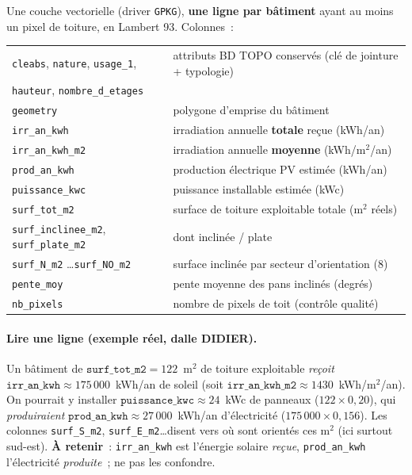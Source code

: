 \documentclass[11pt,a4paper]{article}
\newcommand{\fichier}[1]{\texttt{#1}}
\newcommand{\fonction}[1]{\texttt{#1}}
\begin{document}
Une couche vectorielle (driver \fichier{GPKG}), \textbf{une ligne par bâtiment}
ayant au moins un pixel de toiture, en Lambert 93. Colonnes~:

\begin{center}
\begin{tabular}{@{}l p{9cm}@{}}
\toprule
\fichier{cleabs}, \fichier{nature}, \fichier{usage\_1}, & attributs BD TOPO
conservés (clé de jointure + typologie)\\
\fichier{hauteur}, \fichier{nombre\_d\_etages} & \\
\fichier{geometry} & polygone d'emprise du bâtiment\\
\midrule
\fichier{irr\_an\_kwh} & irradiation annuelle \textbf{totale} reçue (kWh/an)\\
\fichier{irr\_an\_kwh\_m2} & irradiation annuelle \textbf{moyenne} (kWh/m$^2$/an)\\
\fichier{prod\_an\_kwh} & production électrique PV estimée (kWh/an)\\
\fichier{puissance\_kwc} & puissance installable estimée (kWc)\\
\fichier{surf\_tot\_m2} & surface de toiture exploitable totale (m$^2$ réels)\\
\fichier{surf\_inclinee\_m2}, \fichier{surf\_plate\_m2} & dont inclinée / plate\\
\fichier{surf\_N\_m2} \ldots \fichier{surf\_NO\_m2} & surface inclinée par
secteur d'orientation (8)\\
\fichier{pente\_moy} & pente moyenne des pans inclinés (degrés)\\
\fichier{nb\_pixels} & nombre de pixels de toit (contrôle qualité)\\
\bottomrule
\end{tabular}
\end{center}

\paragraph{Lire une ligne (exemple réel, dalle DIDIER).} Un bâtiment de
$\fonction{surf\_tot\_m2} = 122$~m$^2$ de toiture exploitable \emph{reçoit}
$\fonction{irr\_an\_kwh} \approx 175\,000$~kWh/an de soleil (soit
$\fonction{irr\_an\_kwh\_m2} \approx 1430$~kWh/m$^2$/an). On pourrait y installer
$\fonction{puissance\_kwc} \approx 24$~kWc de panneaux ($122 \times 0{,}20$), qui
\emph{produiraient} $\fonction{prod\_an\_kwh} \approx 27\,000$~kWh/an
d'électricité ($175\,000 \times 0{,}156$). Les colonnes \fonction{surf\_S\_m2},
\fonction{surf\_E\_m2}\ldots disent vers où sont orientés ces m$^2$ (ici surtout
sud-est). \textbf{À retenir}~: \fonction{irr\_an\_kwh} est l'énergie solaire
\emph{reçue}, \fonction{prod\_an\_kwh} l'électricité \emph{produite}~; ne pas les
confondre.
\end{document}

